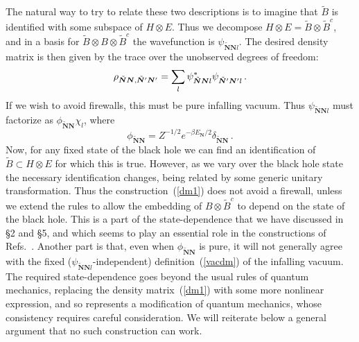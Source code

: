 \documentclass[12pt]{article}
\newcommand{\be}{\begin{equation}}
\newcommand{\ee}{\end{equation}}
\begin{document}
The natural way to try to relate these two descriptions is to imagine that $\tilde B$ is identified with some subspace of $H \otimes E$.  Thus we decompose $H \otimes E = \tilde B \otimes \tilde B^c$, and in a basis for $\tilde B \otimes B \otimes \tilde B^c$ the wavefunction is
$
\psi_{\tilde{\bm N}\bm N l} .
$
The desired density matrix is then given by the trace over the unobserved degrees of freedom:
\be
\rho_{\tilde{\bm N} \bm N,\tilde{\bm N}{}' \bm N'} = \sum_l  \psi^*_{\tilde{\bm N} \bm Nl}  \psi^{\vphantom{*}}_{\tilde{\bm N}{}'\bm N'l} \,.  \label{dm1}
\ee
If we wish to avoid firewalls, this must be pure infalling vacuum.  Thus $\psi_{\tilde{\bm N} \bm Nl}$ must factorize as $\phi_{\tilde{\bm N} \bm N} \chi_l$, where
\be
\phi_{\tilde{\bm N} \bm N} = Z^{-1/2} e^{-\beta E_{\bm N}{/2}} \delta_{\tilde{\bm N} \bm N} \,.  \label{vacdm}
\ee
Now, for {any fixed state of the black hole we can find an identification of $\tilde B \subset H \otimes E$ for which this is true.  However, as we vary over the black hole state the necessary identification changes, being related by some generic unitary transformation.}  Thus the construction~(\ref{dm1}) does not avoid a firewall, unless we extend the rules to allow the embedding of $B \otimes \tilde B^c$ to depend on the state of the black hole.  This is a part of the state-dependence that we have discussed in \S2 and \S5, and which seems to play an essential role in the constructions of Refs.~\cite{Papadodimas:2012aq,Verlinde:2012cy}. Another part is that, even when $\phi_{\tilde{\bm N} \bm N}$ is pure, it will not generally agree with the fixed ($\psi_{\tilde{\bm N} \bm Nl}$-independent) definition~(\ref{vacdm}) of the infalling vacuum.
The required state-dependence goes beyond the usual rules of quantum mechanics, replacing the density matrix~(\ref{dm1}) with some more nonlinear expression, and so represents a modification of quantum mechanics, whose consistency requires careful consideration.  We will reiterate below a general argument that no such construction can work.
\end{document}
